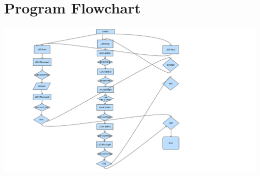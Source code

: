 \documentclass[12pt]{report}
\begin{document}
\section*{Program Flowchart}
	\begin{center}
		\includegraphics[scale=.18]{flowchart.PNG}
	\end{center}
\end{document}
